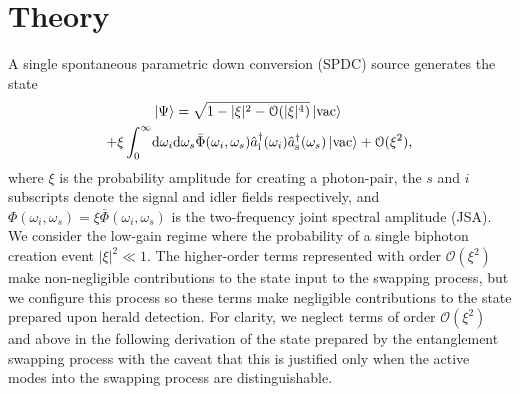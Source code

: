 \documentclass[twocolumn,amssymb, nobibnotes, showpacs, aps, pra,10pt]{revtex4-1}
\newcommand*{\ai}{\hat{a}_{\textrm{i}}}
\newcommand*{\as}{\hat{a}_{\textrm{s}}}
\newcommand*{\wi}{\omega_{i}}
\newcommand*{\ws}{\omega_{s}}
\newcommand*{\vacuum}{\ket{\textrm{vac}}}
\begin{document}
\section{Theory} \label{sec:theory}
A single spontaneous parametric down conversion (SPDC) source generates the state
\begin{equation}
\begin{split}
&\ket{\Psi} = \sqrt{1-|\xi|^2 - \mathcal{O}(|\xi|^4)}\vacuum \\
 + \xi \int_0^\infty &\text{d}\wi \text{d}\ws \bar{\Phi}(\wi, \ws) \ai^\dagger(\wi) \as^\dagger(\ws)  \vacuum + \mathcal{O}(\xi^2), \label{eq:SPDCstate}
\end{split}
\end{equation}
where $\xi$ is the probability amplitude for creating a photon-pair, the $s$ and $i$ subscripts denote the signal and idler fields respectively, and $\Phi(\wi, \ws) = \xi \bar{\Phi}(\wi, \ws)$ is the two-frequency joint spectral amplitude (JSA). We consider the low-gain regime where the probability of a single biphoton creation event $|\xi|^2 \ll 1$. The higher-order terms represented with order $\mathcal{O}(\xi^2)$ make non-negligible contributions to the state input to the swapping process, but we configure this process so these terms make negligible contributions to the state prepared upon herald detection. For clarity, we neglect terms of order $\mathcal{O}(\xi^2)$ and above in the following derivation of the state prepared by the entanglement swapping process with the caveat that this is justified only when the active modes into the swapping process are distinguishable.
\end{document}
